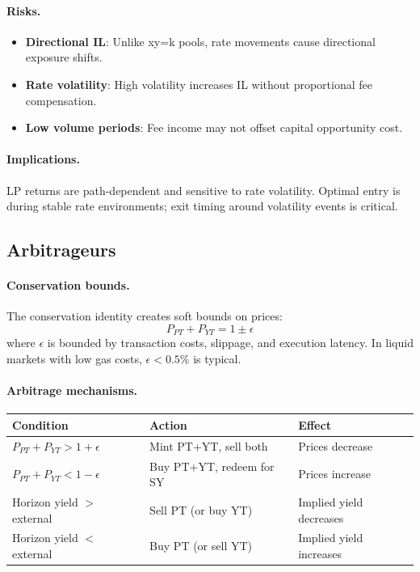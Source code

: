 \paragraph{Risks.}
\begin{itemize}
\item \textbf{Directional IL}: Unlike xy=k pools, rate movements cause directional exposure shifts.
\item \textbf{Rate volatility}: High volatility increases IL without proportional fee compensation.
\item \textbf{Low volume periods}: Fee income may not offset capital opportunity cost.
\end{itemize}

\paragraph{Implications.}
LP returns are path-dependent and sensitive to rate volatility. Optimal entry is during stable rate environments; exit timing around volatility events is critical.

\subsection{Arbitrageurs}

\paragraph{Conservation bounds.}
The conservation identity creates soft bounds on prices:
\[
P_{PT} + P_{YT} = 1 \pm \epsilon
\]
where $\epsilon$ is bounded by transaction costs, slippage, and execution latency. In liquid markets with low gas costs, $\epsilon < 0.5\%$ is typical.

\paragraph{Arbitrage mechanisms.}

\begin{center}
\begin{tabular}{lll}
\toprule
\textbf{Condition} & \textbf{Action} & \textbf{Effect} \\
\midrule
$P_{PT} + P_{YT} > 1 + \epsilon$ & Mint PT+YT, sell both & Prices decrease \\
$P_{PT} + P_{YT} < 1 - \epsilon$ & Buy PT+YT, redeem for SY & Prices increase \\
Horizon yield $>$ external & Sell PT (or buy YT) & Implied yield decreases \\
Horizon yield $<$ external & Buy PT (or sell YT) & Implied yield increases \\
\bottomrule
\end{tabular}
\end{center}


